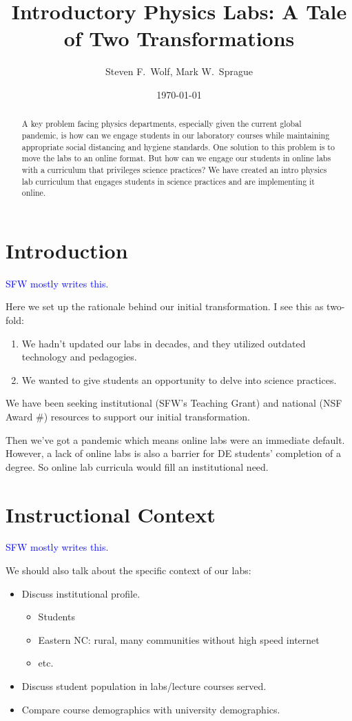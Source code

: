 \documentclass{article}
\title{Introductory Physics Labs:  A Tale of Two Transformations}
\author{Steven F.\ Wolf, Mark W.\ Sprague}
\date{\today}
\begin{document}
\maketitle

\begin{abstract}
  A key problem facing physics departments, especially given the current global pandemic, is
  how can we engage students in our laboratory courses while maintaining appropriate social
  distancing and hygiene standards.  One solution to this problem is to move the labs to an
  online format.  But how can we engage our students in online labs with a curriculum that
  privileges science practices?  We have created an intro physics lab curriculum that engages
  students in science practices and are implementing it online.
\end{abstract}

\section{Introduction}
\textcolor{blue}{SFW mostly writes this.}

Here we set up the rationale behind our initial transformation.  I see this as two-fold:
\begin{enumerate}
  \item We hadn't updated our labs in decades, and they utilized outdated technology and
  pedagogies.
  \item We wanted to give students an opportunity to delve into science practices.
\end{enumerate}
We have been seeking institutional (SFW's Teaching Grant) and national (NSF Award \#) resources
to support our initial transformation.

Then we've got a pandemic which means online labs were an immediate default. However, a lack of
online labs is also a barrier for DE students' completion of a degree.  So online lab curricula
would fill an institutional need.

\section{Instructional Context}
\textcolor{blue}{SFW mostly writes this.}

We should also talk about the specific context of our labs:
\begin{itemize}
  \item Discuss institutional profile.
      \begin{itemize}
          \item Students
          \item Eastern NC: rural, many communities without high speed internet
          \item etc.
      \end{itemize}
  \item Discuss student population in labs/lecture courses served.
  \item Compare course demographics with university demographics.
\end{itemize}
\end{document}
